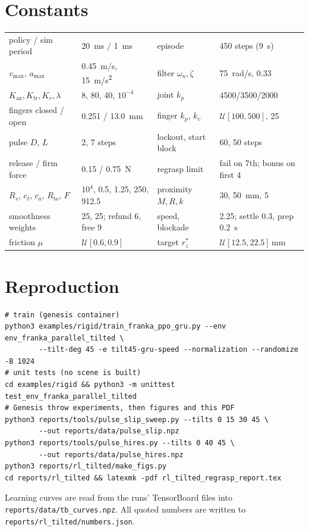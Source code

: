 \documentclass[10.5pt,a4paper]{article}
\newcommand{\code}[1]{\texttt{#1}}
\begin{document}
\section{Constants}
\begin{center}\small
\begin{tabular}{llll}
\toprule
policy / sim period & \SI{20}{ms} / \SI{1}{ms} & episode & 450 steps (\SI{9}{s})\\
$v_{\max}$, $a_{\max}$ & \SI{0.45}{m/s}, \SI{15}{m/s^2} & filter $\omega_n,\zeta$ & \SI{75}{rad/s}, 0.33\\
$K_{\text{ax}}, K_{\text{tr}}, K_r, \lambda$ & 8, 80, 40, $10^{-4}$ & joint $k_p$ & 4500/3500/2000\\
fingers closed / open & 0.251 / \SI{13.0}{mm} & finger $k_p$, $k_v$ & $\mathcal U[100,500]$, 25\\
pulse $D$, $L$ & 2, 7 steps & lockout, start block & 60, 50 steps\\
release / firm force & 0.15 / \SI{0.75}{N} & regrasp limit & fail on 7th; bonus on first 4\\
$R_s$, $c_t$, $c_a$, $R_{\text{to}}$, $F$ & $10^4$, 0.5, 1.25, 250, 912.5 & proximity $M,R,k$ & 30, \SI{50}{mm}, 5\\
smoothness weights & 25, 25; refund 6, free 9 & speed, blockade & 2.25; settle 0.3, prep \SI{0.2}{s}\\
friction $\mu$ & $\mathcal U[0.6,0.9]$ & target $r_z^*$ & $\mathcal U[12.5,22.5]$\,mm\\
\bottomrule
\end{tabular}
\end{center}

\section{Reproduction}
\begin{verbatim}
# train (genesis container)
python3 examples/rigid/train_franka_ppo_gru.py --env env_franka_parallel_tilted \
        --tilt-deg 45 -e tilt45-gru-speed --normalization --randomize -B 1024
# unit tests (no scene is built)
cd examples/rigid && python3 -m unittest test_env_franka_parallel_tilted
# Genesis throw experiments, then figures and this PDF
python3 reports/tools/pulse_slip_sweep.py --tilts 0 15 30 45 \
        --out reports/data/pulse_slip.npz
python3 reports/tools/pulse_hires.py --tilts 0 40 45 \
        --out reports/data/pulse_hires.npz
python3 reports/rl_tilted/make_figs.py
cd reports/rl_tilted && latexmk -pdf rl_tilted_regrasp_report.tex
\end{verbatim}
Learning curves are read from the runs' TensorBoard files into \code{reports/data/tb\_curves.npz}. All quoted
numbers are written to \code{reports/rl\_tilted/numbers.json}.
\end{document}
